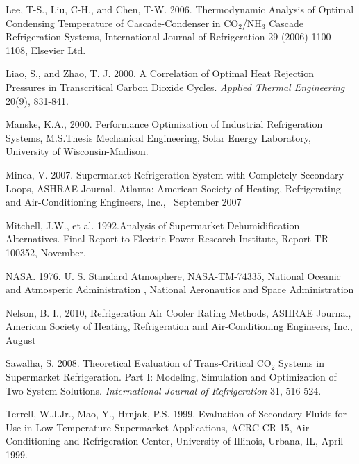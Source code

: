 Lee, T-S., Liu, C-H., and Chen, T-W. 2006. Thermodynamic Analysis of Optimal Condensing Temperature of Cascade-Condenser in CO\(_{2}\)/NH\(_{3}\) Cascade Refrigeration Systems, International Journal of Refrigeration 29 (2006) 1100-1108, Elsevier Ltd.

Liao, S., and Zhao, T. J. 2000. A Correlation of Optimal Heat Rejection Pressures in Transcritical Carbon Dioxide Cycles. \emph{Applied Thermal Engineering} 20(9), 831-841.

Manske, K.A., 2000. Performance Optimization of Industrial Refrigeration Systems, M.S.Thesis Mechanical Engineering, Solar Energy Laboratory, University of Wisconsin-Madison.

Minea, V. 2007. Supermarket Refrigeration System with Completely Secondary Loops, ASHRAE Journal, Atlanta: American Society of Heating, Refrigerating and Air-Conditioning Engineers, Inc., ~September 2007

Mitchell, J.W., et al. 1992.Analysis of Supermarket Dehumidification Alternatives. Final Report to Electric Power Research Institute, Report TR-100352, November.

NASA. 1976. U. S. Standard Atmosphere, NASA-TM-74335, National Oceanic and Atmosperic Administration , National Aeronautics and Space Administration

Nelson, B. I., 2010, Refrigeration Air Cooler Rating Methods, ASHRAE Journal, American Society of Heating, Refrigeration and Air-Conditioning Engineers, Inc., August

Sawalha, S. 2008. Theoretical Evaluation of Trans-Critical CO\(_{2}\) Systems in Supermarket Refrigeration. Part I: Modeling, Simulation and Optimization of Two System Solutions. \emph{International Journal of Refrigeration} 31, 516-524.

Terrell, W.J.Jr., Mao, Y., Hrnjak, P.S. 1999. Evaluation of Secondary Fluids for Use in Low-Temperature Supermarket Applications, ACRC CR-15, Air Conditioning and Refrigeration Center, University of Illinois, Urbana, IL, April 1999.
